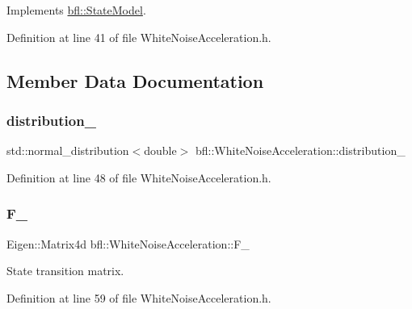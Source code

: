 Implements \mbox{\hyperlink{classbfl_1_1StateModel_ac86dcdad8f0bbfab39a23e592779feaa}{bfl\+::\+State\+Model}}.



Definition at line 41 of file White\+Noise\+Acceleration.\+h.



\subsection{Member Data Documentation}
\mbox{\label{classbfl_1_1WhiteNoiseAcceleration_a771c84333ff5fd6f22a3096cca69352b}} 
\subsubsection{\texorpdfstring{distribution\+\_\+}{distribution\_}}
{\footnotesize\ttfamily std\+::normal\+\_\+distribution$<$double$>$ bfl\+::\+White\+Noise\+Acceleration\+::distribution\+\_\+\hspace{0.3cm}{\ttfamily [private]}}



Definition at line 48 of file White\+Noise\+Acceleration.\+h.

\mbox{\label{classbfl_1_1WhiteNoiseAcceleration_a59d7b07c95daa0c953b00ad3ba6c7b2e}} 
\subsubsection{\texorpdfstring{F\+\_\+}{F\_}}
{\footnotesize\ttfamily Eigen\+::\+Matrix4d bfl\+::\+White\+Noise\+Acceleration\+::\+F\+\_\+\hspace{0.3cm}{\ttfamily [protected]}}



State transition matrix. 



Definition at line 59 of file White\+Noise\+Acceleration.\+h.



